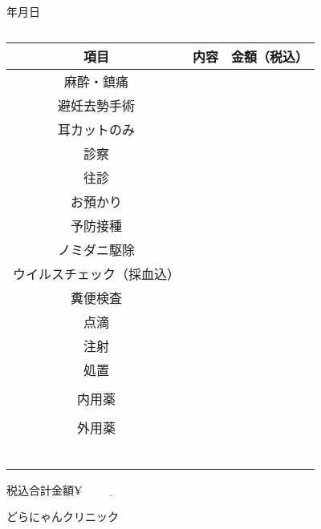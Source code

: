 \documentclass[b5paper, twocolumn, landscape]{jsarticle}
\begin{document}
\begin{flushright}
\normalsize
\vspace{-23pt}
年\hspace{20pt}月\hspace{20pt}日
\end{flushright}
\vspace{-40pt}
\begin{table}[htbp]
	\captionsetup{labelformat=empty,labelsep=none}
	\caption{}
	\label{}
	\begin{center}
	\small
	\begin{tabular}{c|c|c}  \toprule
	項目 & 内容 & 金額（税込）  \\ \hline
	麻酔・鎮痛 & \hspace{100pt} & \\[2pt]
	避妊去勢手術 &  & \\[2pt]
	耳カットのみ &  & \\[2pt]
	診察 &  & \\[2pt]
	往診 &  & \\[2pt]
	お預かり &  & \\[2pt]
	予防接種 &  & \\[2pt]
	ノミダニ駆除 &  & \\[2pt]
	ウイルスチェック（採血込） &  & \\[2pt]
	糞便検査 &  & \\[2pt]
	点滴 &  & \\[2pt]
	注射 &  & \\[2pt]
	処置 &  & \\
	 &  & \\
	内用薬 &  & \\
	 &  & \\
	外用薬 &  & \\
	 &  & \\
	 &  & \\
	 &  & \\
	 &  & \\
	 &  & \\
	 &  & \\  \bottomrule
	 \end{tabular}
	 \end{center}
\end{table}
\small


\vspace{-20pt}

\flushright
\hspace{100pt}税込合計金額$\underline{\yen \hspace{70pt}}$
\vspace{5pt}

\hspace{150pt}どらにゃんクリニック
\end{document}
